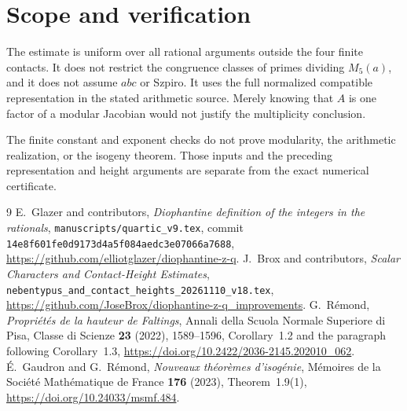 \documentclass[11pt,a4paper]{article}
\begin{document}
\section{Scope and verification}

The estimate is uniform over all rational arguments outside the four
finite contacts. It does not restrict the congruence classes of primes
dividing \(M_5(a)\), and it does not assume \(abc\) or Szpiro.
It uses the full normalized compatible representation in the stated
arithmetic source. Merely knowing that \(A\) is one factor of a modular
Jacobian would not justify the multiplicity conclusion.

The finite constant and exponent checks do not prove modularity,
the arithmetic realization, or the isogeny theorem. Those inputs and
the preceding representation and height arguments are separate from
the exact numerical certificate.

\begin{thebibliography}{9}\small
{}
E.~Glazer and contributors, \emph{Diophantine definition of the integers
in the rationals}, \texttt{manuscripts/quartic\_v9.tex}, commit
\texttt{14e8f601fe0d9173d4a5f084aedc3e07066a7688},
\url{https://github.com/elliotglazer/diophantine-z-q}.
J.~Brox and contributors, \emph{Scalar Characters and Contact-Height
Estimates}, \texttt{nebentypus\_and\_contact\_heights\_20261110\_v18.tex},
\url{https://github.com/JoseBrox/diophantine-z-q_improvements}.
G.~R\'emond, \emph{Propri\'et\'es de la hauteur de Faltings},
Annali della Scuola Normale Superiore di Pisa, Classe di Scienze
\textbf{23} (2022), 1589--1596, Corollary~1.2 and the paragraph
following Corollary~1.3,
\url{https://doi.org/10.2422/2036-2145.202010_062}.
\'E.~Gaudron and G.~R\'emond, \emph{Nouveaux th\'eor\`emes d'isog\'enie},
M\'emoires de la Soci\'et\'e Math\'ematique de France
\textbf{176} (2023), Theorem~1.9(1),
\url{https://doi.org/10.24033/msmf.484}.
\end{thebibliography}
\end{document}
